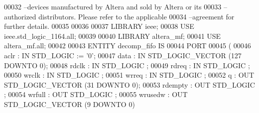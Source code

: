 \begin{DoxyCode}
{00032 \textcolor{keyword}{--devices manufactured by Altera and sold by Altera or its }
00033 \textcolor{keyword}{--authorized distributors.  Please refer to the applicable }
00034 \textcolor{keyword}{--agreement for further details.}
00035 
00036 
00037 \textcolor{vhdlkeyword}{LIBRARY }\textcolor{keywordflow}{ieee};
00038 \textcolor{vhdlkeyword}{USE }ieee.std\_logic\_1164.\textcolor{keywordflow}{all};
00039 
00040 \textcolor{vhdlkeyword}{LIBRARY }\textcolor{keywordflow}{altera\_mf};
00041 \textcolor{vhdlkeyword}{USE }\textcolor{keywordflow}{altera\_mf.all};
00042 
00043 \textcolor{keywordflow}{ENTITY }decomp_fifo \textcolor{keywordflow}{IS}
00044     \textcolor{keywordflow}{PORT}
00045     \textcolor{vhdlchar}{(}
00046         \textcolor{vhdlchar}{aclr}        \textcolor{vhdlchar}{:} \textcolor{keywordflow}{IN} \textcolor{comment}{STD\_LOGIC}  \textcolor{vhdlchar}{:=} \textcolor{vhdlchar}{'}\textcolor{vhdllogic}{}\textcolor{vhdllogic}{0}\textcolor{vhdlchar}{'};
00047         \textcolor{vhdlchar}{data}        \textcolor{vhdlchar}{:} \textcolor{keywordflow}{IN} \textcolor{comment}{STD\_LOGIC\_VECTOR} \textcolor{vhdlchar}{(}\textcolor{vhdllogic}{}\textcolor{vhdllogic}{127} \textcolor{keywordflow}{DOWNTO} \textcolor{vhdllogic}{}\textcolor{vhdllogic}{0}\textcolor{vhdlchar}{)};
00048         \textcolor{vhdlchar}{rdclk}       \textcolor{vhdlchar}{:} \textcolor{keywordflow}{IN} \textcolor{comment}{STD\_LOGIC} ;
00049         \textcolor{vhdlchar}{rdreq}       \textcolor{vhdlchar}{:} \textcolor{keywordflow}{IN} \textcolor{comment}{STD\_LOGIC} ;
00050         \textcolor{vhdlchar}{wrclk}       \textcolor{vhdlchar}{:} \textcolor{keywordflow}{IN} \textcolor{comment}{STD\_LOGIC} ;
00051         \textcolor{vhdlchar}{wrreq}       \textcolor{vhdlchar}{:} \textcolor{keywordflow}{IN} \textcolor{comment}{STD\_LOGIC} ;
00052         \textcolor{vhdlchar}{q}       \textcolor{vhdlchar}{:} \textcolor{keywordflow}{OUT} \textcolor{comment}{STD\_LOGIC\_VECTOR} \textcolor{vhdlchar}{(}\textcolor{vhdllogic}{}\textcolor{vhdllogic}{31} \textcolor{keywordflow}{DOWNTO} \textcolor{vhdllogic}{}\textcolor{vhdllogic}{0}\textcolor{vhdlchar}{)};
00053         \textcolor{vhdlchar}{rdempty}     \textcolor{vhdlchar}{:} \textcolor{keywordflow}{OUT} \textcolor{comment}{STD\_LOGIC} ;
00054         \textcolor{vhdlchar}{wrfull}      \textcolor{vhdlchar}{:} \textcolor{keywordflow}{OUT} \textcolor{comment}{STD\_LOGIC} ;
00055         \textcolor{vhdlchar}{wrusedw}     \textcolor{vhdlchar}{:} \textcolor{keywordflow}{OUT} \textcolor{comment}{STD\_LOGIC\_VECTOR} \textcolor{vhdlchar}{(}\textcolor{vhdllogic}{}\textcolor{vhdllogic}{9} \textcolor{keywordflow}{DOWNTO} \textcolor{vhdllogic}{}\textcolor{vhdllogic}{0}\textcolor{vhdlchar}{)}
}
\end{DoxyCode}
